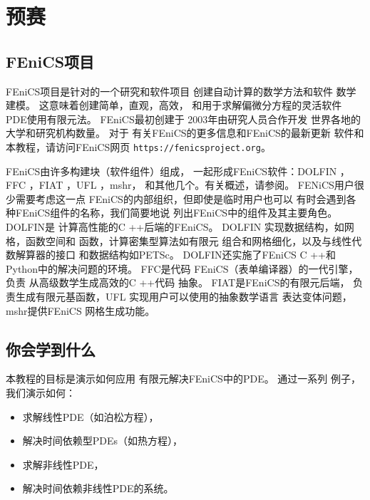 \chapter{预赛}
\label{ch:prelim}

\section{FEniCS项目}
FEniCS项目是针对的一个研究和软件项目
创建自动计算的数学方法和软件
数学建模。 这意味着创建简单，直观，高效，
和用于求解偏微分方程的灵活软件
PDE使用有限元法。 FEniCS最初创建于
2003年由研究人员合作开发
世界各地的大学和研究机构数量。 对于
有关FEniCS的更多信息和FEniCS的最新更新
软件和本教程，请访问FEniCS网页
\texttt{https://fenicsproject.org}。


FEniCS由许多构建块（软件组件）组成，
一起形成FEniCS软件：DOLFIN \cite{DOLFIN}，FFC
\cite{FFC}，FIAT \cite{FIAT}，UFL \cite{UFL_2014}，mshr，
和其他几个。有关概述，请参阅\cite{FEniCS}。
FENiCS用户很少需要考虑这一点
FEniCS的内部组织，但即使是临时用户也可以
有时会遇到各种FEniCS组件的名称，我们简要地说
列出FEniCS中的组件及其主要角色。 DOLFIN是
计算高性能的C ++后端的FEniCS。 DOLFIN
实现数据结构，如网格，函数空间和
函数，计算密集型算法如有限元
组合和网格细化，以及与线性代数解算器的接口
和数据结构如PETSc。 DOLFIN还实施了FEniCS
C ++和Python中的解决问题的环境。 FFC是代码
FEniCS（表单编译器）的一代引擎，负责
从高级数学生成高效的C ++代码
抽象。 FIAT是FEniCS的有限元后端，
负责生成有限元基函数，UFL
实现用户可以使用的抽象数学语言
表达变体问题，mshr提供FEniCS
网格生成功能。

\section{你会学到什么}

本教程的目标是演示如何应用
有限元解决FEniCS中的PDE。 通过一系列
例子，我们演示如何：

\begin{itemize}
  \item 求解线性PDE（如泊松方程），

  \item 解决时间依赖型PDEs（如热方程），

  \item 求解非线性PDE，

  \item 解决时间依赖非线性PDE的系统。
\end{itemize}

